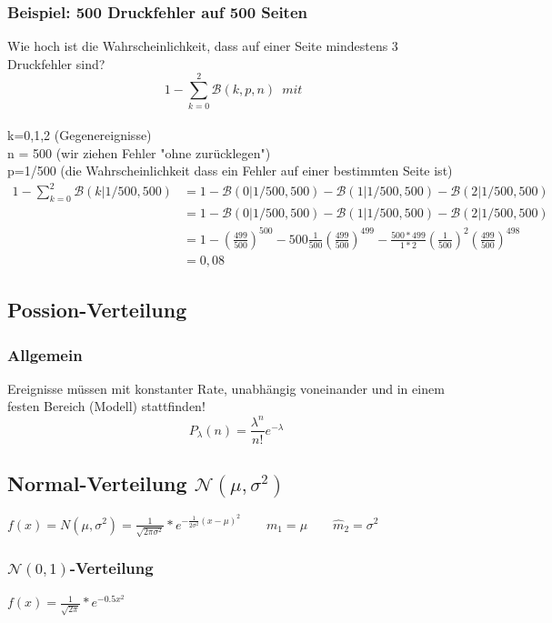 \documentclass{article}
\begin{document}
\subsubsection{Beispiel: 500 Druckfehler auf 500 Seiten}
Wie hoch ist die Wahrscheinlichkeit, dass auf einer Seite mindestens 3 Druckfehler
sind?
\[
1- \sum_{k=0}^{2} \mathcal{B}(k,p,n) \enspace mit \enspace \] \\
k=0,1,2 (Gegenereignisse)\\ n = 500
(wir ziehen Fehler "ohne zur\"ucklegen") \\ p=1/500 (die Wahrscheinlichkeit dass
ein Fehler auf einer bestimmten Seite ist)\\
\begin{equation*}
	\begin{split}
		1- \sum_{k=0}^{2} \mathcal{B}(k|1/500,500)& = 1 - \mathcal{B}(0|1/500,500) - \mathcal{B}(1|1/500,500) - \mathcal{B}(2|
		1/500,500) \\
		& = 1 -  \mathcal{B}(0|1/500,500) - \mathcal{B}(1|1/500,500) - \mathcal{B}(2|
		1/500,500) \\
		& = 1 - \left( \frac{499}{500} \right) ^{500} - 500\frac{1}{500}\left(\frac{499}{500}\right)^{499} - \frac{500*499}{1*2}\left( \frac{1}{500} \right) ^2 \left( \frac{499}{500} \right) ^{498} \\ & = 0,08
	\end{split}
\end{equation*}
\subsection{Possion-Verteilung}
\subsubsection{Allgemein}
Ereignisse m\"ussen mit konstanter Rate, unabh\"angig voneinander und in einem festen 
Bereich (Modell) stattfinden!
\[
	P_{\lambda}(n) = \frac{\lambda ^n}{n!} e ^{- \lambda}
\]
\subsection{Normal-Verteilung $\mathcal{N}(\mu, \sigma^2)$}
$f(x) = N(\mu, \sigma^2) = \frac{1}{\sqrt{2\pi\sigma^2}}*e^{-\frac{1}{2\sigma^2}(x-		
\mu)^2} \quad \quad m_1 = \mu \quad \quad \widehat{m}_2=\sigma^2$
\subsubsection{$\mathcal{N}(0,1)$-Verteilung}
$f(x) = \frac{1}{\sqrt{2\pi}}*e^{-0.5x^2}$
\end{document}
